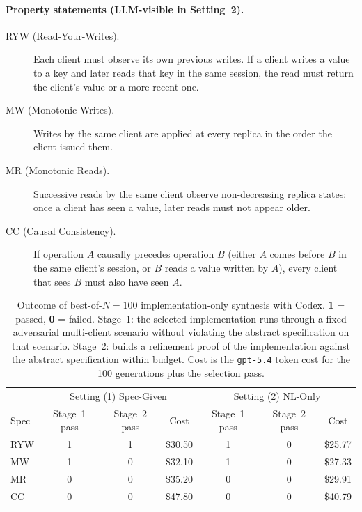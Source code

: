 \paragraph{Property statements (LLM-visible in Setting~2).}
\begin{description}
\item[RYW (Read-Your-Writes).] Each client must observe its own previous writes. If a client writes a value to a key and later reads that key in the same session, the read must return the client's value or a more recent one.
\item[MW (Monotonic Writes).] Writes by the same client are applied at every replica in the order the client issued them.
\item[MR (Monotonic Reads).] Successive reads by the same client observe non-decreasing replica states: once a client has seen a value, later reads must not appear older.
\item[CC (Causal Consistency).] If operation $A$ causally precedes operation $B$ (either $A$ comes before $B$ in the same client's session, or $B$ reads a value written by $A$), every client that sees $B$ must also have seen $A$.
\end{description}

\begin{table}[h]
\centering
\small
\begin{tabular}{l|ccc|ccc}
\toprule
 & \multicolumn{3}{c|}{Setting (1) Spec-Given} & \multicolumn{3}{c}{Setting (2) NL-Only} \\
Spec & Stage~1 pass & Stage~2 pass & Cost & Stage~1 pass & Stage~2 pass & Cost \\
\midrule
RYW & 1 & 1 & \$30.50 & 1 & 0 & \$25.77 \\
MW  & 1 & 0 & \$32.10 & 1 & 0 & \$27.33 \\
MR  & 0 & 0 & \$35.20 & 0 & 0 & \$29.91 \\
CC  & 0 & 0 & \$47.80 & 0 & 0 & \$40.79 \\
\bottomrule
\end{tabular}
\caption{Outcome of best-of-$N{=}100$ implementation-only synthesis with Codex. \textbf{1} = passed, \textbf{0} = failed. Stage~1: the selected implementation runs through a fixed adversarial multi-client scenario without violating the abstract specification on that scenario. Stage~2: \sys{} builds a refinement proof of the implementation against the abstract specification within budget. Cost is the \texttt{gpt-5.4} token cost for the 100 generations plus the selection pass.}
\label{tab:llm-only-synthesis}
\end{table}


